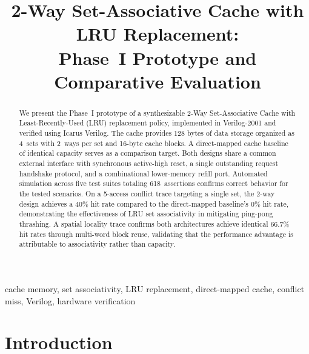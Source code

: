 \documentclass[conference]{IEEEtran}
\begin{document}
\title{2-Way Set-Associative Cache with LRU Replacement:\\Phase~I Prototype and Comparative Evaluation}

\author{
}

\maketitle

\begin{abstract}
We present the Phase~I prototype of a synthesizable 2-Way Set-Associative
Cache with Least-Recently-Used (LRU) replacement policy, implemented in
Verilog-2001 and verified using Icarus Verilog.  The cache provides 128
bytes of data storage organized as 4~sets with 2~ways per set and 16-byte
cache blocks.  A direct-mapped cache baseline of identical capacity serves
as a comparison target.  Both designs share a common external interface with
synchronous active-high reset, a single outstanding request handshake
protocol, and a combinational lower-memory refill port.  Automated
simulation across five test suites totaling 618~assertions confirms
correct behavior for the tested scenarios.  On a 5-access conflict trace targeting a single
set, the 2-way design achieves a 40\% hit rate compared to the
direct-mapped baseline's 0\% hit rate, demonstrating the effectiveness of
LRU set associativity in mitigating ping-pong thrashing.  A spatial
locality trace confirms both architectures achieve identical 66.7\% hit
rates through multi-word block reuse, validating that the performance
advantage is attributable to associativity rather than capacity.
\end{abstract}

\begin{IEEEkeywords}
cache memory, set associativity, LRU replacement, direct-mapped cache,
conflict miss, Verilog, hardware verification
\end{IEEEkeywords}

\section{Introduction}
\end{document}
